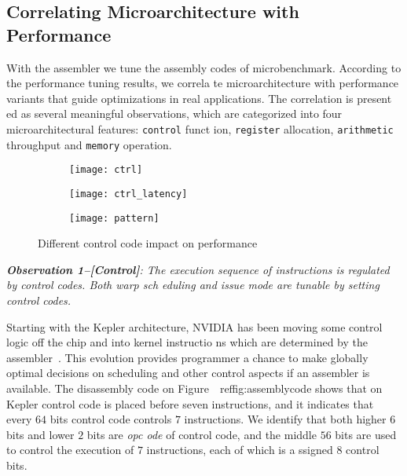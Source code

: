 \subsection{Correlating Microarchitecture with Performance}
\label{sec:benchmark}


With the assembler we tune the assembly codes of microbenchmark. According to the performance tuning results, we correla
te microarchitecture with performance variants that guide optimizations in real applications. The correlation is present
ed as several meaningful observations, which are categorized into four microarchitectural features:  {\tt control} funct
ion, {\tt register} allocation, {\tt arithmetic} throughput and {\tt memory} operation.
    \begin{figure*}
        \begin{subfigure}[htbp]{0.3\textwidth}
            \texttt{[image: ctrl]}
            \label{fig:control_throughput}
        \end{subfigure}
        \begin{subfigure}[htbp]{0.3\textwidth}
            \texttt{[image: ctrl\_latency]}
            \label{fig:control_latency}
        \end{subfigure}
        \begin{subfigure}[htbp]{0.3\textwidth}
            \texttt{[image: pattern]}
            \label{fig:control_pattern}
        \end{subfigure}
        \caption{Different control code impact on performance}\label{fig:control_code}
    \end{figure*}


{\em {\bf Observation 1--[Control]}: The execution sequence of instructions is regulated by control codes. Both warp sch
eduling and issue mode are tunable by setting control codes.}

Starting with the Kepler architecture, NVIDIA has been moving some control logic off the chip and into kernel instructio
ns which are determined by the assembler~\cite{lai,maxas}. This evolution provides programmer a chance to make globally 
optimal decisions on scheduling and other control aspects if an assembler is available. The disassembly code on Figure~\
ref{fig:assemblycode} shows that on Kepler control code is placed before seven instructions, and it indicates that every
 $64$ bits control code controls $7$ instructions. We identify that both higher $6$ bits and lower $2$ bits are {\em opc
ode} of control code, and the middle $56$ bits are used to control the execution of $7$ instructions, each of which is a
ssigned $8$ control bits.

